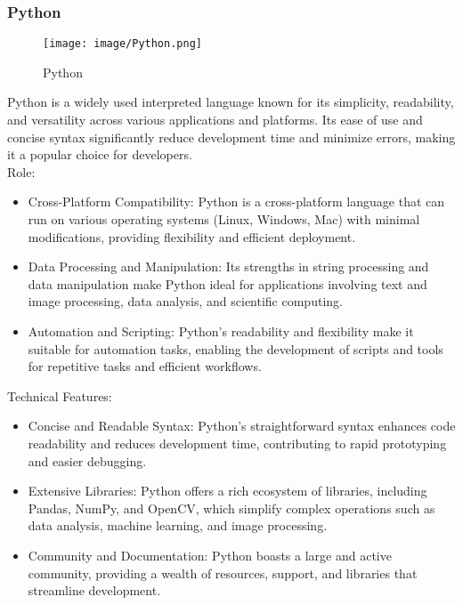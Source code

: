 \documentclass[conference]{IEEEtran}
\begin{document}
\subsubsection{Python}

\begin{figure}[h!]
    \centering
    \texttt{[image: image/Python.png]}
    \caption{Python}
    \label{fig:enter-label}
\end{figure}


\noindent Python is a widely used interpreted language known for its simplicity, readability, and versatility across various applications and platforms. Its ease of use and concise syntax significantly reduce development time and minimize errors, making it a popular choice for developers.\\

Role:
\begin{itemize}
    \item Cross-Platform Compatibility: Python is a cross-platform language that can run on various operating systems (Linux, Windows, Mac) with minimal modifications, providing flexibility and efficient deployment.\\
    \item Data Processing and Manipulation: Its strengths in string processing and data manipulation make Python ideal for applications involving text and image processing, data analysis, and scientific computing.\\
    \item Automation and Scripting: Python's readability and flexibility make it suitable for automation tasks, enabling the development of scripts and tools for repetitive tasks and efficient workflows.\\
\end{itemize}

Technical Features:
\begin{itemize}
    \item Concise and Readable Syntax: Python’s straightforward syntax enhances code readability and reduces development time, contributing to rapid prototyping and easier debugging.\\
    \item Extensive Libraries: Python offers a rich ecosystem of libraries, including Pandas, NumPy, and OpenCV, which simplify complex operations such as data analysis, machine learning, and image processing.\\
    \item Community and Documentation: Python boasts a large and active community, providing a wealth of resources, support, and libraries that streamline development.\\
\end{itemize}
\end{document}
